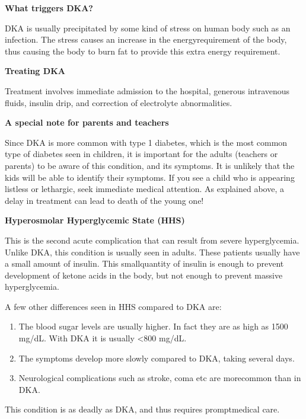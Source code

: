 \noindent\textbf{What triggers DKA?}

\vskip 5pt

DKA is usually precipitated by some kind of stress on human body such as an infection. The stress causes an increase in the energy\break requirement of the body, thus causing the body to burn fat to provide this extra energy requirement.

\noindent\textbf{Treating DKA}

Treatment involves immediate admission to the hospital, gene\-rous intravenous fluids, insulin drip, and correction of electrolyte abnorma\-lities.

\noindent\textbf{A special note for parents and teachers}

Since DKA is more common with type 1 diabetes, which is the most common type of diabetes seen in children, it is important for the adults (teachers or parents) to be aware of this condition, and its symptoms. It is unlikely that the kids will be able to identify their symptoms. If you see a child who is appearing listless or lethargic, seek immediate medical attention. As explained above, a delay in treatment can lead to death of the young one!

\noindent\textbf{Hyperosmolar Hyperglycemic State (HHS)}

This is the second acute complication that can result from severe hyperglycemia. Unlike DKA, this condition is usually seen in adults. These patients usually have a small amount of insulin. This small\break quantity of insulin is enough to prevent development of ketone acids in the body, but not enough to prevent massive hyperglycemia.

\noindent A few other differences seen in HHS compared to DKA are:

\vspace{-\topsep}
\begin{enumerate}[•]
\itemsep=0pt
\item The blood sugar levels are usually higher. In fact they are as high as 1500 mg/dL. With DKA it is usually \textless 800 mg/dL.
\item The symptoms develop more slowly compared to DKA, taking several days.
\item Neurological complications such as stroke, coma etc are more\break common than in DKA.
\end{enumerate}
\vspace{-\topsep}

This condition is as deadly as DKA, and thus requires prompt\break medical care.

